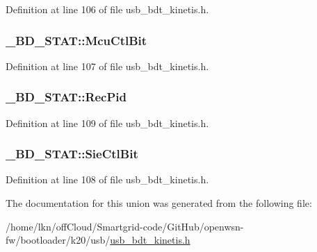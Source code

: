 Definition at line 106 of file usb\+\_\+bdt\+\_\+kinetis.\+h.

\subsubsection[{\texorpdfstring{Mcu\+Ctl\+Bit}{McuCtlBit}}]{ \+\_\+\+B\+D\+\_\+\+S\+T\+A\+T\+::\+Mcu\+Ctl\+Bit}\hypertarget{union___b_d___s_t_a_t_a6f3454ad380bb97ebc18bff0aebd7dbf}{}\label{union___b_d___s_t_a_t_a6f3454ad380bb97ebc18bff0aebd7dbf}


Definition at line 107 of file usb\+\_\+bdt\+\_\+kinetis.\+h.

\subsubsection[{\texorpdfstring{Rec\+Pid}{RecPid}}]{ \+\_\+\+B\+D\+\_\+\+S\+T\+A\+T\+::\+Rec\+Pid}\hypertarget{union___b_d___s_t_a_t_a1e2426c2abc396ce01a4b4c3ab50e39b}{}\label{union___b_d___s_t_a_t_a1e2426c2abc396ce01a4b4c3ab50e39b}


Definition at line 109 of file usb\+\_\+bdt\+\_\+kinetis.\+h.

\subsubsection[{\texorpdfstring{Sie\+Ctl\+Bit}{SieCtlBit}}]{ \+\_\+\+B\+D\+\_\+\+S\+T\+A\+T\+::\+Sie\+Ctl\+Bit}\hypertarget{union___b_d___s_t_a_t_adbf25cf7fb5a7928b7b73ab29e5c1816}{}\label{union___b_d___s_t_a_t_adbf25cf7fb5a7928b7b73ab29e5c1816}


Definition at line 108 of file usb\+\_\+bdt\+\_\+kinetis.\+h.



The documentation for this union was generated from the following file\+:\begin{DoxyCompactItemize}
\item 
/home/lkn/off\+Cloud/\+Smartgrid-\/code/\+Git\+Hub/openwsn-\/fw/bootloader/k20/usb/\hyperlink{usb__bdt__kinetis_8h}{usb\+\_\+bdt\+\_\+kinetis.\+h}\end{DoxyCompactItemize}
